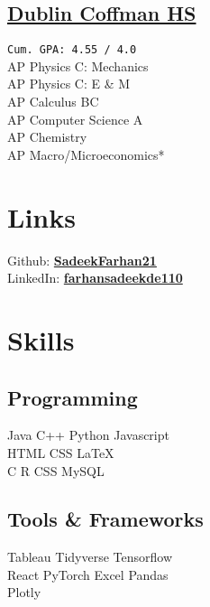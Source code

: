 \documentclass[]{Farhan_Resume_Class}
\begin{document}
\begin{minipage}[t]{0.27\textwidth}
    \sectionsep
    \subsection{\href{https://www.dublinschools.net/Coffman}{Dublin Coffman HS}}
    \texttt{Cum. GPA: 4.55 / 4.0} \\
    AP Physics C: Mechanics \\
    AP Physics C: E & M \\
    AP Calculus BC \\
    AP Computer Science A\\
    AP Chemistry\\
    AP Macro/Microeconomics*\\


    
\sectionsep    
\section{Links}
Github: \href{https://github.com/SadeekFarhan21}{\bf SadeekFarhan21} \\
LinkedIn:  \href{https://www.linkedin.com/in/farhansadeekde110/}{\bf farhansadeekde110} \\


    \section{Skills}
    \subsection{Programming}
    Java \textbullet{}   C++ \textbullet{} Python \textbullet{} Javascript \\
    HTML \textbullet{} CSS \textbullet \LaTeX \\
    C \textbullet{} R \textbullet{} CSS \textbullet{} \textbullet{} MySQL \\
    \vspace{1em}
    \subsection{Tools \& Frameworks}
    Tableau \textbullet{} Tidyverse \textbullet{} Tensorflow \\ React \textbullet{}
    PyTorch \textbullet{} Excel \textbullet{} Pandas\\ Plotly


\end{minipage}
\end{document}
